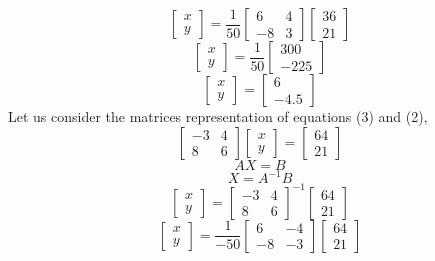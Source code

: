 \documentclass[journal,12pt,twocolumn]{IEEEtran}
\begin{document}
\[
\begin{bmatrix}
x \\ y
\end{bmatrix}
=
\frac{1}{50}
\begin{bmatrix}
6 & 4 \\
-8 & 3 
\end{bmatrix}
\begin{bmatrix}
36 \\ 21
\end{bmatrix}
\]
\[
\begin{bmatrix}
x \\ y
\end{bmatrix}
=
\frac{1}{50}
\begin{bmatrix}
300 \\ -225
\end{bmatrix}
\]
\begin{equation}
\begin{bmatrix}
x \\ y
\end{bmatrix}
=
\begin{bmatrix}
6 \\ -4.5
\end{bmatrix}
\end{equation}
\noindent
Let us consider the matrices representation of equations (3) and (2),
\[
\begin{bmatrix}
-3 & 4 \\
8 & 6 
\end{bmatrix}
\begin{bmatrix}
x \\ y
\end{bmatrix}
=
\begin{bmatrix}
64 \\ 21
\end{bmatrix}
\]
$$AX=B$$
$$X= A^{-1}B$$
\[
\begin{bmatrix}
x \\ y
\end{bmatrix}
=
\begin{bmatrix}
-3 & 4 \\
8 & 6 
\end{bmatrix}^{-1}
\begin{bmatrix}
64 \\ 21
\end{bmatrix}
\]
\[
\begin{bmatrix}
x \\ y
\end{bmatrix}
=
\frac{1}{-50}
\begin{bmatrix}
6 & -4 \\
-8 & -3 
\end{bmatrix}
\begin{bmatrix}
64 \\ 21
\end{bmatrix}
\]
\end{document}
